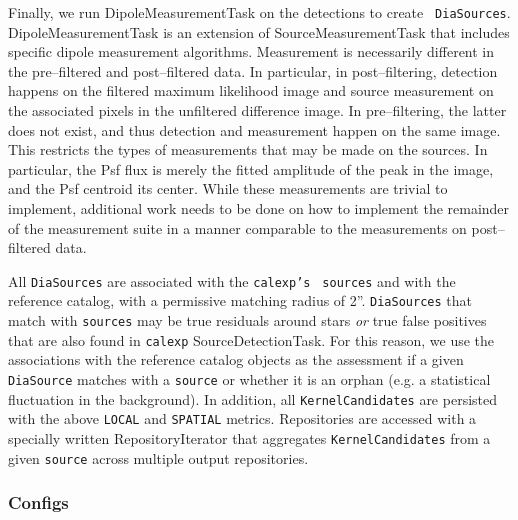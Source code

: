 \documentclass[prd, nofootinbib, floatfix, 11pt,tightenlines,times]{article}
\begin{document}
Finally, we run DipoleMeasurementTask on the detections to create {\tt
  DiaSources}.  DipoleMeasurementTask is an extension of
SourceMeasurementTask that includes specific dipole measurement
algorithms.  Measurement is necessarily different in the pre--filtered
and post--filtered data.  In particular, in post--filtering, detection
happens on the filtered maximum likelihood image and source
measurement on the associated pixels in the unfiltered difference
image.  In pre--filtering, the latter does not exist, and thus
detection and measurement happen on the same image.  This restricts
the types of measurements that may be made on the sources.  In
particular, the Psf flux is merely the fitted amplitude of the peak in
the image, and the Psf centroid its center.  While these measurements
are trivial to implement, additional work needs to be done on how to
implement the remainder of the measurement suite in a manner comparable
to the measurements on post--filtered data.

All {\tt DiaSources} are associated with the {\tt calexp's} {\tt
  sources} and with the reference catalog, with a permissive matching
radius of 2''.  {\tt DiaSources} that match with {\tt sources} may be
true residuals around stars {\it or} true false positives that are
also found in {\tt calexp} SourceDetectionTask.  For this reason, we
use the associations with the reference catalog objects as the
assessment if a given {\tt DiaSource} matches with a {\tt source} or
whether it is an orphan (e.g. a statistical fluctuation in the
background).  In addition, all {\tt KernelCandidates} are persisted
with the above {\tt LOCAL} and {\tt SPATIAL} metrics.  Repositories
are accessed with a specially written RepositoryIterator that
aggregates {\tt KernelCandidates} from a given {\tt source} across
multiple output repositories.

\subsubsection{Configs}
\end{document}
